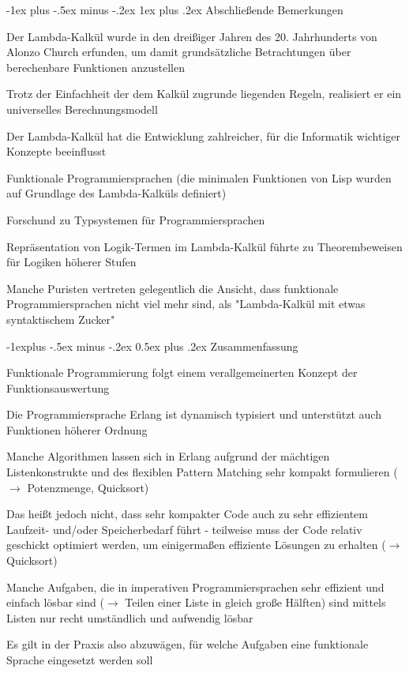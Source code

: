 \documentclass[10pt]{article}
\makeatletter
\renewcommand{\subsection}{\@startsection{subsection}{2}{0mm}%
                                {-1explus -.5ex minus -.2ex}%
                                {0.5ex plus .2ex}%
                                {\normalfont\normalsize\bfseries}}
\renewcommand{\subsubsection}{\@startsection{subsubsection}{3}{0mm}%
                                {-1ex plus -.5ex minus -.2ex}%
                                {1ex plus .2ex}%
                                {\normalfont\small\bfseries}}
\makeatother
\begin{document}
  \subsubsection{Abschließende Bemerkungen}
  \begin{itemize*}
    \item Der Lambda-Kalkül wurde in den dreißiger Jahren des 20. Jahrhunderts von Alonzo Church erfunden, um damit grundsätzliche Betrachtungen über berechenbare Funktionen anzustellen
    \item Trotz der Einfachheit der dem Kalkül zugrunde liegenden Regeln, realisiert er ein universelles Berechnungsmodell
    \item Der Lambda-Kalkül hat die Entwicklung zahlreicher, für die Informatik wichtiger Konzepte beeinflusst
    \begin{itemize*}
      \item Funktionale Programmiersprachen (die minimalen Funktionen von Lisp wurden auf Grundlage des Lambda-Kalküls definiert)
      \item Forschund zu Typsystemen für Programmiersprachen
      \item Repräsentation von Logik-Termen im Lambda-Kalkül führte zu Theorembeweisen für Logiken höherer Stufen
    \end{itemize*}
    \item Manche Puristen vertreten gelegentlich die Ansicht, dass funktionale Programmiersprachen nicht viel mehr sind, als "Lambda-Kalkül mit etwas syntaktischem Zucker"
  \end{itemize*}
  
  \subsection{Zusammenfassung}
  \begin{itemize*}
    \item Funktionale Programmierung folgt einem verallgemeinerten Konzept der Funktionsauswertung
    \item Die Programmiersprache Erlang ist dynamisch typisiert und unterstützt auch Funktionen höherer Ordnung
    \item Manche Algorithmen lassen sich in Erlang aufgrund der mächtigen Listenkonstrukte und des flexiblen Pattern Matching sehr kompakt formulieren ($\rightarrow$ Potenzmenge, Quicksort)
    \item Das heißt jedoch nicht, dass sehr kompakter Code auch zu sehr effizientem Laufzeit- und/oder Speicherbedarf führt - teilweise muss der Code relativ geschickt optimiert werden, um einigermaßen effiziente Lösungen zu erhalten ($\rightarrow$ Quicksort)
    \item Manche Aufgaben, die in imperativen Programmiersprachen sehr effizient und einfach lösbar sind ($\rightarrow$ Teilen einer Liste in gleich große Hälften) sind mittels Listen nur recht umständlich und aufwendig lösbar
    \item Es gilt in der Praxis also abzuwägen, für welche Aufgaben eine funktionale Sprache eingesetzt werden soll
  \end{itemize*}
  
\end{document}
